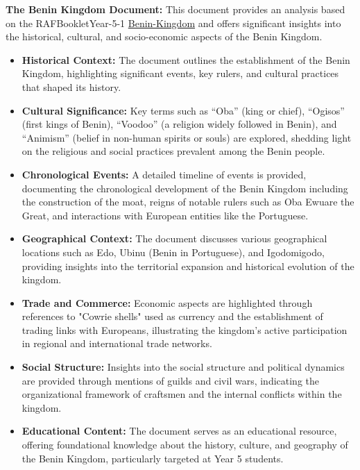 \textbf{The Benin Kingdom Document:}
This document provides an analysis based on the RAFBookletYear-5-1 \href{https://denhamgreenacademy.e-act.org.uk/wp-content/uploads/sites/5/2020/10/RAFBookletYear-5-1Benin-Kingdom-paper-size-297x21-cmUPDATED.210187322-wecompress.com_.pdf}{Benin-Kingdom} and offers significant insights into the historical, cultural, and socio-economic aspects of the Benin Kingdom.

\begin{itemize}
  \item \textbf{Historical Context:} The document outlines the establishment of the Benin Kingdom, highlighting significant events, key rulers, and cultural practices that shaped its history.
  \item \textbf{Cultural Significance:} Key terms such as ``Oba'' (king or chief), ``Ogisos'' (first kings of Benin), ``Voodoo'' (a religion widely followed in Benin), and ``Animism'' (belief in non-human spirits or souls) are explored, shedding light on the religious and social practices prevalent among the Benin people.
  \item \textbf{Chronological Events:} A detailed timeline of events is provided, documenting the chronological development of the Benin Kingdom including the construction of the moat, reigns of notable rulers such as Oba Ewuare the Great, and interactions with European entities like the Portuguese.
  \item \textbf{Geographical Context:} The document discusses various geographical locations such as Edo, Ubinu (Benin in Portuguese), and Igodomigodo, providing insights into the territorial expansion and historical evolution of the kingdom.
  \item \textbf{Trade and Commerce:} Economic aspects are highlighted through references to "Cowrie shells" used as currency and the establishment of trading links with Europeans, illustrating the kingdom's active participation in regional and international trade networks.
  \item \textbf{Social Structure:} Insights into the social structure and political dynamics are provided through mentions of guilds and civil wars, indicating the organizational framework of craftsmen and the internal conflicts within the kingdom.
  \item \textbf{Educational Content:} The document serves as an educational resource, offering foundational knowledge about the history, culture, and geography of the Benin Kingdom, particularly targeted at Year 5 students.
\end{itemize}
